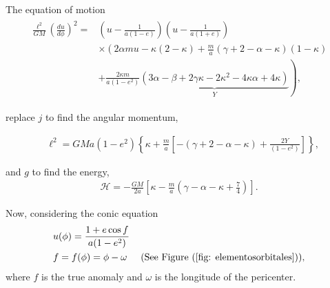 The equation of motion
\begin{align}
\begin{split}
\label{eq: equationmotionsecond}
	\frac{\ell^2}{GM}\left(\frac{du}{d\phi}\right)^2 = &\left(u-\frac{1}{a(1-e)}\right)\left(u-\frac{1}{a(1+e)}\right)\\
	&\times \left(2\alpha m u-\kappa(2-\kappa)+\frac{m}{a}(\gamma+2-\alpha-\kappa)(1-\kappa)\right.\\
	&\left.+\frac{2\kappa m }{a(1-e^2)}\underbrace{(3\alpha-\beta + 2\gamma\kappa -2\kappa^2 - 4\kappa\alpha + 4\kappa )}_Y\right),
	\end{split}
	\end{align}

replace $j$ to find the angular momentum, 

\begin{align}\label{eq: angularmomentumj+1}
	&\ell^2 = GMa(1-e^2)\left\{\kappa+\frac{m}{a}\left[-(\gamma+2-\alpha-\kappa)+\frac{2Y}{(1-e^2)}\right]\right\},
\end{align}
	
and $g$ to find the energy,
\begin{align} \label{eq: energyg+1}
	\mathcal{H} = - \frac{GM}{2a}\left[\kappa-\frac{m}{a}\left(\gamma-\alpha-\kappa+\frac{7}{4}\right)\right].	
\end{align}
	
Now, considering the conic equation
\begin{align}
	&u(\phi) = \frac{1+e\cos f}{a(1-e^2)}\\
	&f=f(\phi) = \phi - \omega \hspace{0.5cm} \text{(See Figure (\ref{fig: elementosorbitales}))},
\end{align}
where $f$ is the true anomaly and $\omega$ is the longitude of the pericenter.\\



